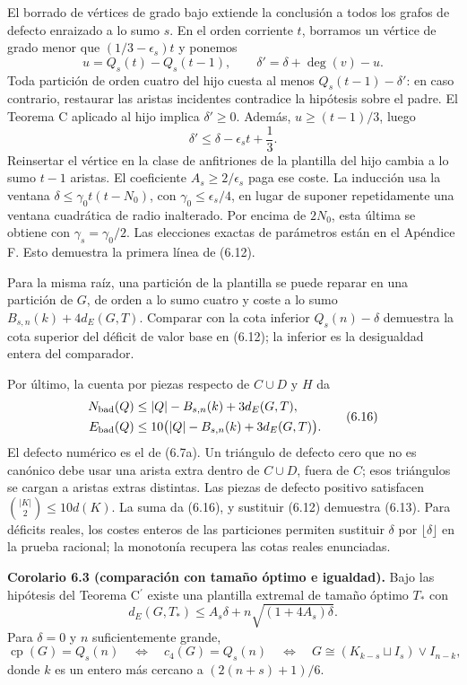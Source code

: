 \documentclass[spanish,11pt,a4paper]{article}
\begin{document}
El borrado de vértices de grado bajo extiende la conclusión a todos los grafos de defecto enraizado a lo sumo \(s\). En el orden corriente \(t\), borramos un vértice de grado menor que \((1/3-\epsilon_s)t\) y ponemos \[
u=Q_s(t)-Q_s(t-1),\qquad
\delta'=\delta+\deg(v)-u.
\tag{6.15}
\] Toda partición de orden cuatro del hijo cuesta al menos \(Q_s(t-1)-\delta'\): en caso contrario, restaurar las aristas incidentes contradice la hipótesis sobre el padre. El Teorema C aplicado al hijo implica \(\delta'\ge0\). Además, \(u\ge(t-1)/3\), luego \[
\delta'\le\delta-\epsilon_s t+\frac13.
\] Reinsertar el vértice en la clase de anfitriones de la plantilla del hijo cambia a lo sumo \(t-1\) aristas. El coeficiente \(A_s\ge2/\epsilon_s\) paga ese coste. La inducción usa la ventana \(\delta\le\gamma_0t(t-N_0)\), con \(\gamma_0\le\epsilon_s/4\), en lugar de suponer repetidamente una ventana cuadrática de radio inalterado. Por encima de \(2N_0\), esta última se obtiene con \(\gamma_s=\gamma_0/2\). Las elecciones exactas de parámetros están en el Apéndice F. Esto demuestra la primera línea de (6.12).

Para la misma raíz, una partición de la plantilla se puede reparar en una partición de \(G\), de orden a lo sumo cuatro y coste a lo sumo \(B_{s,n}(k)+4d_E(G,T)\). Comparar con la cota inferior \(Q_s(n)-\delta\) demuestra la cota superior del déficit de valor base en (6.12); la inferior es la desigualdad entera del comparador.

Por último, la cuenta por piezas respecto de \(C\cup D\) y \(H\) da \[
\begin{aligned}
N_{\rm bad}(Q)&\le |Q|-B_{s,n}(k)+3d_E(G,T),\\
E_{\rm bad}(Q)&\le10\bigl(|Q|-B_{s,n}(k)+3d_E(G,T)\bigr).
\end{aligned}
\tag{6.16}
\] El defecto numérico es el de (6.7a). Un triángulo de defecto cero que no es canónico debe usar una arista extra dentro de \(C\cup D\), fuera de \(C\); esos triángulos se cargan a aristas extras distintas. Las piezas de defecto positivo satisfacen \(\binom{|K|}{2}\le10d(K)\). La suma da (6.16), y sustituir (6.12) demuestra (6.13). Para déficits reales, los costes enteros de las particiones permiten sustituir \(\delta\) por \(\lfloor\delta\rfloor\) en la prueba racional; la monotonía recupera las cotas reales enunciadas.


\textbf{Corolario 6.3 (comparación con tamaño óptimo e igualdad).} Bajo las hipótesis del Teorema \texorpdfstring{C\ensuremath{^{\prime}}}{C'} existe una plantilla extremal de tamaño óptimo \(T_*\) con \[
d_E(G,T_*)\le A_s\delta+n\sqrt{(1+4A_s)\delta}.
\tag{6.17}
\] Para \(\delta=0\) y \(n\) suficientemente grande, \[
\operatorname{cp}(G)=Q_s(n)
\quad\Longleftrightarrow\quad c_4(G)=Q_s(n)
\quad\Longleftrightarrow\quad
G\cong(K_{k-s}\sqcup I_s)\vee I_{n-k},
\tag{6.18}
\] donde \(k\) es un entero más cercano a \((2(n+s)+1)/6\).
\end{document}
